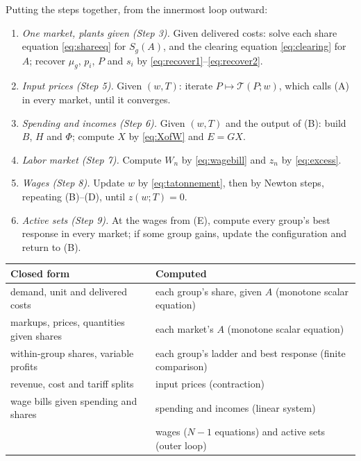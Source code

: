 \documentclass[11pt]{article}
\theoremstyle{remark}
\begin{document}
Putting the steps together, from the innermost loop outward:

\begin{enumerate}[label=(\Alph*)]
\item \emph{One market, plants given (Step 3).} Given delivered costs: solve each
share equation \eqref{eq:shareeq} for $S_g(A)$, and the clearing equation
\eqref{eq:clearing} for $A$; recover $\mu_g$, $p_i$, $P$ and $s_i$ by
\eqref{eq:recover1}--\eqref{eq:recover2}.
\item \emph{Input prices (Step 5).} Given $(w,T)$: iterate $P\mapsto\mathcal T(P;w)$,
which calls (A) in every market, until it converges.
\item \emph{Spending and incomes (Step 6).} Given $(w,T)$ and the output of (B): build
$B$, $H$ and $\Phi$; compute $X$ by \eqref{eq:XofW} and $E=GX$.
\item \emph{Labor market (Step 7).} Compute $W_n$ by \eqref{eq:wagebill} and
$z_n$ by \eqref{eq:excess}.
\item \emph{Wages (Step 8).} Update $w$ by \eqref{eq:tatonnement}, then by Newton
steps, repeating (B)--(D), until $z(w;T)=0$.
\item \emph{Active sets (Step 9).} At the wages from (E), compute every group's best
response in every market; if some group gains, update the configuration and return to
(B).
\end{enumerate}

\begin{center}
\small
\begin{tabular}{@{}ll@{}}
\toprule
Closed form & Computed \\
\midrule
demand, unit and delivered costs & each group's share, given $A$ (monotone scalar equation) \\
markups, prices, quantities given shares & each market's $A$ (monotone scalar equation) \\
within-group shares, variable profits & each group's ladder and best response (finite comparison) \\
revenue, cost and tariff splits & input prices (contraction) \\
wage bills given spending and shares & spending and incomes (linear system) \\
 & wages ($N-1$ equations) and active sets (outer loop) \\
\bottomrule
\end{tabular}
\end{center}
\end{document}
